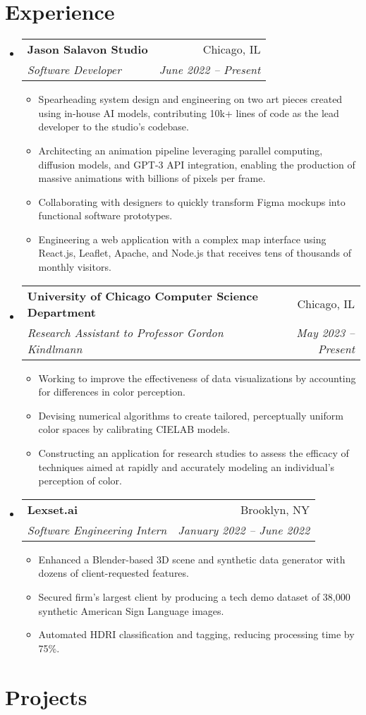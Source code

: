\documentclass[letterpaper,11pt]{article}
\makeatletter
\newcommand{\resumeItem}[1]{
  \item\small{
    {#1 \vspace{-2pt}}
  }
}
\newcommand{\resumeSubheading}[4]{
  \vspace{-2pt}\item
    \begin{tabular*}{0.97\textwidth}[t]{l@{\extracolsep{\fill}}r}
      \textbf{#1} & #2 \\
      \textit{\small#3} & \textit{\small #4} \\
    \end{tabular*}\vspace{-7pt}
}
\newcommand{\resumeSubHeadingListStart}{\begin{itemize}[leftmargin=0.125in, label={}]}
\newcommand{\resumeSubHeadingListEnd}{\end{itemize}}
\newcommand{\resumeItemListStart}{\begin{itemize}[leftmargin=0.25in]
}
\newcommand{\resumeItemListEnd}{\end{itemize}\vspace{-5pt}}
\makeatother
\begin{document}
\section{Experience}
  \resumeSubHeadingListStart
    \resumeSubheading
      {Jason Salavon Studio}
      {Chicago, IL}
      {Software Developer}
      {June 2022 -- Present}
      \resumeItemListStart
        \resumeItem{Spearheading system design and engineering on two art pieces created using in-house AI models, contributing 10k+ lines of code as the lead developer to the studio's codebase.}
        \resumeItem{Architecting an animation pipeline leveraging parallel computing, diffusion models, and GPT-3 API integration, enabling the production of massive animations with billions of pixels per frame.}
        \resumeItem{Collaborating with designers to quickly transform Figma mockups into functional software prototypes.}
        \resumeItem{Engineering a web application with a complex map interface using React.js, Leaflet, Apache, and Node.js that receives tens of thousands of  monthly visitors.}
      \resumeItemListEnd
    \resumeSubheading
      {University of Chicago Computer Science Department}
      {Chicago, IL}
      {Research Assistant to Professor Gordon Kindlmann}
      {May 2023 -- Present}
      \resumeItemListStart
        \resumeItem{Working to improve the effectiveness of data visualizations by accounting for differences in color perception.}
        \resumeItem{Devising numerical algorithms to create tailored, perceptually uniform color spaces by calibrating CIELAB models.}\resumeItem{Constructing an application for research studies to assess the efficacy of techniques aimed at rapidly and accurately modeling an individual's  perception of color.}
      \resumeItemListEnd
    \resumeSubheading
      {Lexset.ai}
      {Brooklyn, NY}
      {Software Engineering Intern}
      {January 2022 -- June 2022}
      \resumeItemListStart
        \resumeItem{Enhanced a Blender-based 3D scene and synthetic data generator with dozens of client-requested features.}
        \resumeItem{Secured firm's largest client by producing a tech demo dataset of 38,000 synthetic American Sign Language images.}\resumeItem{Automated HDRI classification and tagging, reducing processing time by 75\%.}
      \resumeItemListEnd
  \resumeSubHeadingListEnd

\section{Projects}
\end{document}
